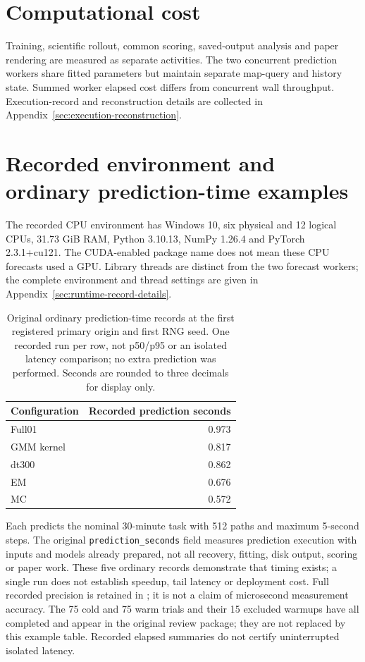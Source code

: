 \section{Computational cost}
Training, scientific rollout, common scoring, saved-output analysis and paper
rendering are measured as separate activities. The two concurrent prediction
workers share fitted parameters but maintain separate map-query and history
state. Summed worker elapsed cost differs from concurrent wall throughput.
Execution-record and reconstruction details are collected in
Appendix~\ref{sec:execution-reconstruction}.


\section{Recorded environment and ordinary prediction-time examples}
\label{sec:preliminary-cost}\hypertarget{sec:preliminary-cost}{}
The recorded CPU environment has Windows 10, six physical and
12 logical CPUs, 31.73 GiB RAM, Python 3.10.13, NumPy 1.26.4 and PyTorch
2.3.1+cu121. The CUDA-enabled package name does not mean these CPU forecasts
used a GPU. Library threads are distinct from the two forecast workers;
the complete environment and thread settings are given in
Appendix~\ref{sec:runtime-record-details}.

\begin{table}[htbp]
\centering\small
\caption{Original ordinary prediction-time records at the first registered
primary origin and first RNG seed. One recorded run per row, not p50/p95
or an isolated latency comparison; no extra prediction was performed.
Seconds are rounded to three decimals for display only.}
\label{tab:preliminary-cost}\hypertarget{tab:preliminary-cost}{}
\begin{tabular}{@{}lr@{}}
\toprule
Configuration & Recorded prediction seconds\\
\midrule
Full01 & 0.973\\
GMM kernel & 0.817\\
dt300 & 0.862\\
EM & 0.676\\
MC & 0.572\\
\bottomrule
\end{tabular}
\end{table}
Each predicts the nominal 30-minute task with 512 paths and maximum 5-second
steps. The original \texttt{prediction\_seconds} field measures prediction
execution with inputs and models already prepared, not all recovery,
fitting, disk output, scoring or paper work. These five ordinary records
demonstrate that timing exists; a single run does not establish speedup,
tail latency or deployment cost. Full recorded precision is retained in
; it is not a claim
of microsecond measurement accuracy. The 75 cold and 75 warm trials and their
15 excluded warmups have all completed and appear in the original review
package; they are not replaced by this example table. Recorded elapsed
summaries do not certify uninterrupted isolated latency.


